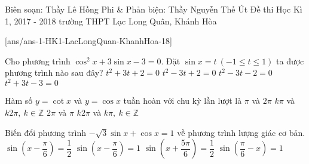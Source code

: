 	\begin{name}
{Biên soạn: Thầy Lê Hồng Phi \& Phản biện: Thầy Nguyễn Thế Út}
		{Đề thi Học Kì 1, 2017 - 2018 trường THPT Lạc Long Quân, Khánh Hòa}
	\end{name}
\setcounter{ex}{0}\setcounter{bt}{0}
[ans/ans-1-HK1-LacLongQuan-KhanhHoa-18]
\begin{ex}%
Cho phương trình $ \cos^2 x+3\sin x-3=0 $. Đặt $ \sin x=t\ (-1\leq t\leq 1) $ ta được phương trình nào sau đây?
\choice
{$ t^2+3t+2=0 $}
{\True $ t^2-3t+2=0 $}
{$ t^2-3t-2=0 $}
{$ t^2+3t-3=0 $}
\end{ex}

\begin{ex}%
Hàm số $ y=\cot x $ và $ y=\cos x $ tuần hoàn với chu kỳ lần lượt là 	
	\choice
	{\True $ \pi $ và $ 2\pi $}
	{$ k\pi $ và $k2\pi,\ k\in\mathbb{Z} $}
	{$ 2\pi $ và $ \pi $}
	{$ k2\pi $ và $k\pi,\ k\in\mathbb{Z} $}
\end{ex}

\begin{ex}%
Biến đổi phương trình $ -\sqrt{3}\sin x+\cos x=1 $ về phương trình lượng giác cơ bản.
\choice
{$ \sin\left(x-\dfrac{\pi}{6}\right)=\dfrac{1}{2} $}
{$ \sin\left(x-\dfrac{\pi}{6}\right)=1 $}
{\True $ \sin\left(x+\dfrac{5\pi}{6}\right)=\dfrac{1}{2} $}
{ $ \sin\left(\dfrac{\pi}{6}-x\right)=1 $}
\end{ex}

